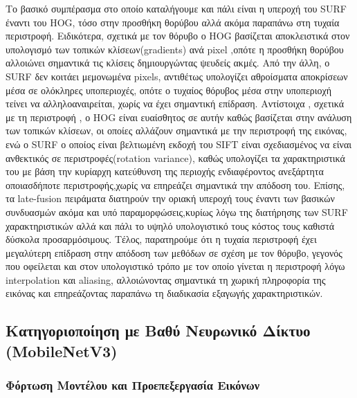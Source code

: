\documentclass[12pt, a4paper]{article}
\begin{document}
Το βασικό συμπέρασμα στο οποίο καταλήγουμε και πάλι είναι η υπεροχή του SURF έναντι του HOG, τόσο στην προσθήκη θορύβου αλλά ακόμα παραπάνω στη τυχαία περιστροφή. 
Ειδικότερα, σχετικά με τον θόρυβο ο HOG βασίζεται αποκλειστικά στον υπολογισμό των τοπικών κλίσεων(gradients) ανά pixel ,οπότε η προσθήκη θορύβου αλλοιώνει σημαντικά τις κλίσεις δημιουργώντας ψευδείς ακμές. Από την άλλη, ο SURF δεν κοιτάει μεμονωμένα pixels, αντιθέτως υπολογίζει αθροίσματα αποκρίσεων  μέσα σε ολόκληρες υποπεριοχές, οπότε ο τυχαίος θόρυβος μέσα στην υποπεριοχή  τείνει να αλληλοαναιρείται, χωρίς να έχει σημαντική επίδραση.
Αντίστοιχα , σχετικά με τη περιστροφή , ο HOG είναι ευαίσθητος σε αυτήν καθώς βασίζεται στην ανάλυση των τοπικών κλίσεων, οι οποίες αλλάζουν σημαντικά με την περιστροφή της εικόνας, ενώ ο SURF ο οποίος είναι βελτιωμένη εκδοχή του SIFT είναι σχεδιασμένος να είναι ανθεκτικός σε περιστροφές(rotation variance), καθώς υπολογίζει τα χαρακτηριστικά του με βάση την κυρίαρχη κατεύθυνση της περιοχής ενδιαφέροντος ανεξάρτητα οποιασδήποτε περιστροφής,χωρίς να  επηρεάζει σημαντικά την απόδοση του.
Επίσης, τα late-fusion πειράματα διατηρούν την οριακή υπεροχή τους έναντι των βασικών συνδυασμών ακόμα και υπό παραμορφώσεις,κυρίως λόγω της διατήρησης των SURF χαρακτηριστικών  αλλά και πάλι το υψηλό υπολογιστικό τους κόστος τους καθιστά δύσκολα προσαρμόσιμους.
Τέλος, παρατηρούμε ότι η τυχαία περιστροφή έχει μεγαλύτερη επίδραση στην απόδοση των μεθόδων σε σχέση με τον θόρυβο, γεγονός που οφείλεται και στον υπολογιστικό τρόπο με τον οποίο γίνεται η περιστροφή λόγω interpolation και aliasing, αλλοιώνοντας σημαντικά τη χωρική πληροφορία της εικόνας και επηρεάζοντας παραπάνω τη διαδικασία εξαγωγής χαρακτηριστικών.\\

\subsection{Κατηγοριοποίηση με Βαθύ Νευρωνικό Δίκτυο (MobileNetV3)}

\subsubsection{Φόρτωση Μοντέλου και Προεπεξεργασία Εικόνων}
\end{document}
